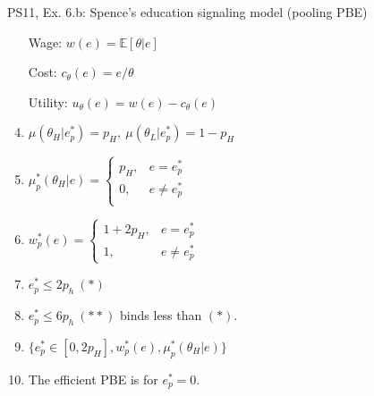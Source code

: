 \begin{frame}{PS11, Ex. 6.b: Spence’s education signaling model (pooling PBE)}
\begin{multicols}{2}
\begin{enumerate}
        \item[Wage:] $w(e)=\mathbb{E}[\theta|e]$
        \item[Cost:] $c_\theta(e)=e/\theta$
        \item[Utility:] $u_\theta(e)=w(e)-c_\theta(e)$
        \item $\mu\left(\theta_H|e_p^*\right)=p_H,\
               \mu\left(\theta_L|e_p^*\right)=1-p_H$
        \item $\mu_p^*(\theta_H|e)=\left\{\begin{array}{rl}
                  p_H, & e = e_p^* \\
                  0, & e \neq e_p^* \\
               \end{array}\right.$
        \item $w_p^*(e)=\left\{\begin{array}{rl}
                  1+2p_H, & e = e_p^* \\
                  1, & e \neq e_p^*
               \end{array}\right.$
        \item $e_p^*\leq2p_h\ (*)$
        \item $e_p^*\leq6p_h\ (**)$ binds less than $(*)$.
        \item $\{e_p^*\in[0,2p_H],w_p^*(e),\mu_p^*(\theta_H|e)\}$
        \item The efficient PBE is for $e_p^*=0$.
      \end{enumerate}
      \vfill\null
    \end{multicols}
\end{frame}
